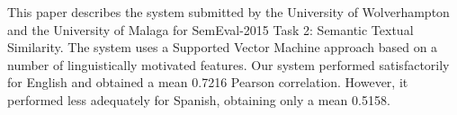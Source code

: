 This paper describes the system submitted by the University of Wolverhampton and the University of Malaga for SemEval-2015 Task 2: Semantic Textual Similarity. The system uses a Supported Vector Machine approach based on a number of linguistically motivated features. Our system performed satisfactorily for English and obtained a mean 0.7216 Pearson correlation. However, it performed less adequately for Spanish, obtaining only a mean 0.5158.
